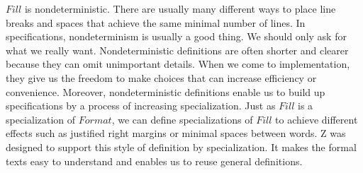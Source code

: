 $Fill$ is nondeterministic.  There are usually many different ways to
place line breaks and spaces that achieve the same minimal number of
lines.  In specifications, nondeterminism is usually a good thing.  We
should only ask for what we really want.  Nondeterministic definitions
are often shorter and clearer because they can omit unimportant
details.  When we come to implementation, they give us the freedom to
make choices that can increase efficiency or convenience.  Moreover,
nondeterministic definitions enable us to build up specifications by a
process of increasing specialization.  Just as $Fill$ is a
specialization of $Format$, we can define specializations of $Fill$ to
achieve different effects such as justified right margins or minimal
spaces between words.  Z was designed to support this style of
definition by specialization.  It makes the formal texts easy to
understand and enables us to reuse general definitions.
